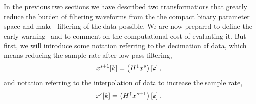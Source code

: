 In the previous two sections we have described two transformations that greatly
reduce the burden of filtering waveforms from the the compact binary parameter space and make \TD\
filtering of the data possible.  We are now prepared to define the early
warning \SNR\ and to comment on the computational cost of evaluating it.  But
first, we will introduce some notation referring to the decimation of data,
which means reducing the sample rate after low-pass filtering,
\begin{equation*}
\label{eq:decomp}
	x^{s+1}[k] = \left( H^\shortdownarrow x^s\right)[k] \,,
\end{equation*}
and notation referring to the interpolation of data to increase the sample rate,
\begin{equation*}
	x^{s}[k] = \left( H^\shortuparrow x^{s+1}\right)[k] \,.
\end{equation*}


